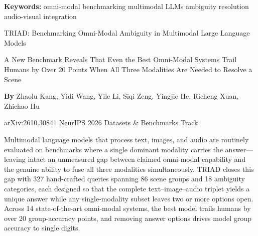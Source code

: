 \documentclass[10pt,twocolumn]{article}
\begin{document}
\setlength{\parindent}{0pt}
\setlength{\parskip}{4pt}

{\small\color{keywordgray}\textbf{Keywords:}
  omni-modal benchmarking \textbullet{}
  multimodal LLMs \textbullet{}
  ambiguity resolution \textbullet{}
  audio-visual integration}\par\vspace{4pt}

{\LARGE\bfseries\raggedright
  TRIAD: Benchmarking Omni-Modal Ambiguity in
  Multimodal Large Language Models}\par\vspace{4pt}

{\large\itshape\raggedright
  A New Benchmark Reveals That Even the Best Omni-Modal Systems
  Trail Humans by Over 20 Points When All Three Modalities Are
  Needed to Resolve a Scene}\par\vspace{6pt}

{\small\textbf{By} Zhaolu Kang, Yidi Wang, Yile Li, Siqi Zeng,
  Yingjie He, Richeng Xuan, Zhichao Hu}\par\vspace{2pt}

{\small\color{keywordgray}arXiv:2610.30841 \textbullet{}
  NeurIPS 2026 Datasets \& Benchmarks Track}
\par\vspace{2pt}\noindent{\color{rulered}\rule{\columnwidth}{0.6pt}}\vspace{6pt}

Multimodal language models that process text, images, and audio are
routinely evaluated on benchmarks where a single dominant modality
carries the answer---leaving intact an unmeasured gap between claimed
omni-modal capability and the genuine ability to fuse all three
modalities simultaneously. TRIAD closes this gap with 327 hand-crafted
queries spanning 86 scene groups and 18 ambiguity categories, each
designed so that the complete text--image--audio triplet yields a unique
answer while any single-modality subset leaves two or more options open.
Across 14 state-of-the-art omni-modal systems, the best model trails
humans by over 20 group-accuracy points, and removing answer options
drives model group accuracy to single digits.
\end{document}
